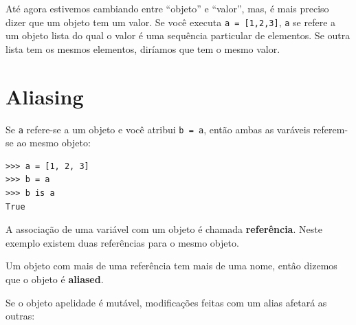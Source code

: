 
Até agora estivemos cambiando entre ``objeto'' e ``valor'', mas, é
mais preciso dizer que um objeto tem um valor. Se você executa 
{\tt a = [1,2,3]}, {\tt a} se refere a um objeto lista do qual o
valor é uma sequência particular de elementos. Se outra lista tem os mesmos
elementos, diríamos que tem o mesmo valor. 




\section{Aliasing}


Se {\tt a} refere-se a um objeto e você atribui {\tt b = a},
então ambas as varáveis referem-se ao mesmo objeto:


\beforeverb
\begin{verbatim}
>>> a = [1, 2, 3]
>>> b = a
>>> b is a
True
\end{verbatim}
\afterverb
%

A associação de uma variável com um objeto é chamada
{\bf referência}. Neste exemplo existem duas referências para o
mesmo objeto.



Um objeto com mais de uma referência tem mais de uma nome,
entâo dizemos que o objeto é {\bf aliased}.




Se o objeto apelidade é mutável,
modificações feitas com um alias 
afetará as outras:


